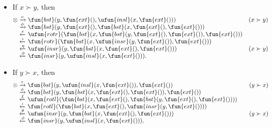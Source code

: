 \begin{itemize}

  \item If \(x \succ y\), then
\begin{equation*}
\begin{array}{@{}r@{\;}l@{\;}l@{\quad}r@{}}
\otimes
& \xrightarrow{\smash{\upsilon}} &
  \fun{bst}(y,\fun{ext}(),\ufun{insl}(x,\fun{ext}()))
& (x \succ y)\\
& \xrightarrow{\smash{\phi}} &
  \fun{bst}(y,\fun{ext}(),\fun{bst}(x,\fun{ext}(),\fun{ext}()))\\
& \xleftarrow{\smash{\epsilon}} &
  \ufun{rotr}(\fun{bst}(x,\fun{bst}(y,\fun{ext}(),\fun{ext}()),\fun{ext}()))\\
& \xleftarrow{\smash{\iota}} &
  \fun{rotr}(\fun{bst}(x,\ufun{insr}(y,\fun{ext}()),\fun{ext}()))\\
& \xleftarrow{\smash{\eta}} &
  \ufun{insr}(y,\fun{bst}(x,\fun{ext}(),\fun{ext}()))
& (x \succ y)\\
& \xleftarrow{\smash{\phi}} &
  \fun{insr}(y,\ufun{insl}(x,\fun{ext}())).
\end{array}
\end{equation*}

  \item If \(y \succ x\), then
\begin{equation*}
\begin{array}{@{}r@{\;}l@{\;}l@{\qquad}r@{}}
\otimes & \xrightarrow{\smash{\tau}} &
  \fun{bst}(y,\ufun{insl}(x,\fun{ext}()),\fun{ext}())
& (y \succ x)\\
& \xrightarrow{\smash{\phi}} &
  \fun{bst}(y,\fun{bst}(x,\fun{ext}(),\fun{ext}()),\fun{ext}())\\
& \xleftarrow{\smash{\xi}} &
  \ufun{rotl}(\fun{bst}(x,\fun{ext}(),\fun{bst}(y,\fun{ext}(),\fun{ext}())))\\
& \xleftarrow{\smash{\iota}} &
  \fun{rotl}(\fun{bst}(x,\fun{ext}(),\ufun{insr}(y,\fun{ext}())))\\
& \xleftarrow{\smash{\theta}} &
  \ufun{insr}(y,\fun{bst}(x,\fun{ext}(),\fun{ext}()))
& (y \succ x)\\
& \xleftarrow{\smash{\phi}} &
  \fun{insr}(y,\ufun{insl}(x,\fun{ext}())).
\end{array}
\end{equation*}
\end{itemize}

